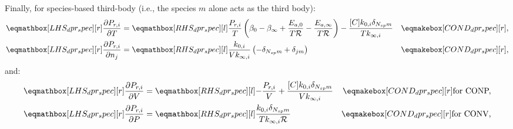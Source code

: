 \documentclass[12pt]{article}
\newcommand{\ns}{N_{sp}}
\newcommand{\conp}{CONP}
\newcommand{\conv}{CONV}
\newcommand{\dconp}{\ifmmode\text{for \conp,}\else for \conp,\fi}
\newcommand{\dconv}{\ifmmode\text{for \conv,}\else for \conv.\fi}
\newcommand{\Ru}{\mathcal{R}}
\begin{document}
Finally, for species-based third-body (i.e., the species $m$ alone acts as the third body):
\begin{align}
 \lhs{dpr_spec}{\frac{\partial P_{r, i} }{\partial T }} &=\rhs{dpr_spec}{\frac{P_{r, i}}{T} \left(\beta_{0} - \beta_{\infty} + \frac{E_{a, 0}}{T \Ru} - \frac{E_{a, \infty}}{T \Ru}\right) - \frac{[C] k_{0, i} \delta_{\ns m}}{T k_{\infty, i}}} & \cond{dpr_spec}{,} \label{e:dpr_spec_dt} \\
 \lhs{dpr_spec}{\frac{\partial P_{r, i} }{\partial n_j }} &=\rhs{dpr_spec}{\frac{k_{0, i}}{V k_{\infty, i}} \left(- \delta_{\ns m} + \delta_{j m}\right)} & \cond{dpr_spec}{,} \label{e:dpr_spec_dnj}
\end{align}
and:
\begin{subequations}
 \label{e:dpr_spec_de}
 \begin{align}
  \lhs{dpr_spec}{\frac{\partial P_{r, i} }{\partial V }} &= \rhs{dpr_spec}{- \frac{P_{r, i}}{V} + \frac{[C] k_{0, i} \delta_{\ns m}}{V k_{\infty, i}}} & \cond{dpr_spec}{\dconp}\\
  \lhs{dpr_spec}{\frac{\partial P_{r, i} }{\partial P }} &= \rhs{dpr_spec}{\frac{k_{0, i} \delta_{\ns m}}{T k_{\infty, i} \Ru}} & \cond{dpr_spec}{\dconv}
 \end{align}
\end{subequations}
\end{document}
